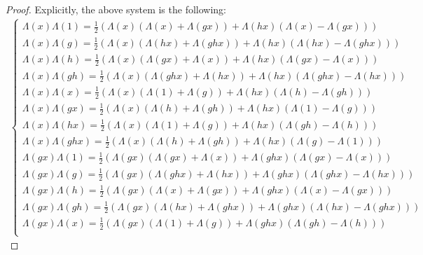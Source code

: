 \documentclass[reqno]{amsart}
\theoremstyle{definition}
\numberwithin{equation}{section}\theoremstyle{plain}
\theoremstyle{definition}
\begin{document}
\begin{proof}
Explicitly, the above system is the following: 
\begin{align*}
\left\{
\begin{array}{lll}
\Lambda(x)\Lambda(1)  = \frac{1}{2} \left(\Lambda(x)  \left( \Lambda(x) + \Lambda(gx) \right) + \Lambda(hx) \left( \Lambda(x) - \Lambda(gx) \right) \right) \\
\Lambda(x)\Lambda(g)  = \frac{1}{2} \left(\Lambda(x) \left( \Lambda(hx) + \Lambda(ghx) \right) + \Lambda(hx) \left(\Lambda(hx) - \Lambda(ghx) \right) \right) \\
\Lambda(x)\Lambda(h)  = \frac{1}{2} \left(\Lambda(x) \left(\Lambda(gx) + \Lambda(x) \right) + \Lambda(hx) \left( \Lambda(gx) - \Lambda(x) \right) \right) \\
\Lambda(x)\Lambda(gh)  = \frac{1}{2} \left(\Lambda(x) \left(\Lambda(ghx) + \Lambda(hx) \right) + \Lambda(hx) \left( \Lambda(ghx) - \Lambda(hx) \right) \right) \\
\Lambda(x)\Lambda(x)  = \frac{1}{2} \left(\Lambda(x) \left( \Lambda(1) + \Lambda(g) \right) + \Lambda(hx) \left( \Lambda(h) -\Lambda(gh) \right) \right) \\
\Lambda(x)\Lambda(gx)  = \frac{1}{2} \left(\Lambda(x) \left( \Lambda(h) + \Lambda(gh) \right) + \Lambda(hx) \left( \Lambda(1) - \Lambda(g) \right) \right) \\
\Lambda(x)\Lambda(hx)  = \frac{1}{2} \left(\Lambda(x) \left( \Lambda(1) + \Lambda(g) \right) + \Lambda(hx) \left( \Lambda(gh) - \Lambda(h) \right) \right) \\
\Lambda(x)\Lambda(ghx)  = \frac{1}{2} \left(\Lambda(x) \left( \Lambda(h) + \Lambda(gh) \right) + \Lambda(hx) \left( \Lambda(g) - \Lambda(1)\right) \right) \\
\Lambda(gx)\Lambda(1)  = \frac{1}{2} \left(\Lambda(gx) \left( \Lambda(gx) + \Lambda(x) \right) + \Lambda(ghx) \left( \Lambda(gx) - \Lambda(x) \right) \right)\\
\Lambda(gx)\Lambda(g)  = \frac{1}{2} \left(\Lambda(gx)\left(\Lambda(ghx) + \Lambda(hx) \right) + \Lambda(ghx) \left( \Lambda(ghx) -\Lambda(hx)\right) \right) \\
\Lambda(gx)\Lambda(h)  = \frac{1}{2} \left(\Lambda(gx) \left(\Lambda(x) + \Lambda(gx) \right) + \Lambda(ghx) \left( \Lambda(x) - \Lambda(gx) \right) \right)\\
\Lambda(gx)\Lambda(gh)  = \frac{1}{2} \left(\Lambda(gx) \left( \Lambda(hx) + \Lambda(ghx) \right) + \Lambda(ghx) \left( \Lambda(hx) - \Lambda(ghx)\right) \right) \\
\Lambda(gx)\Lambda(x)  = \frac{1}{2} \left(\Lambda(gx) \left( \Lambda(1) + \Lambda(g) \right) + \Lambda(ghx) \left( \Lambda(gh) - \Lambda(h) \right)\right)\\

\end{array}
\end{align*}
\end{proof}
\end{document}
